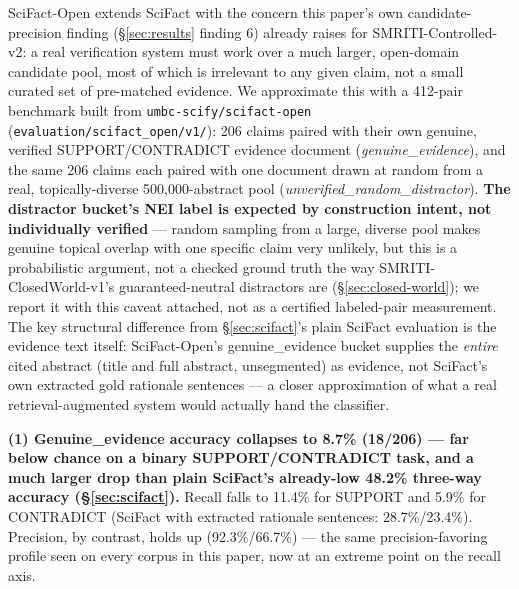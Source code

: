 

SciFact-Open \citep{wadden2022scifact} extends SciFact with the concern
this paper's own candidate-precision finding (\S\ref{sec:results} finding
6) already raises for SMRITI-Controlled-v2: a real verification system
must work over a much larger, open-domain candidate pool, most of which
is irrelevant to any given claim, not a small curated set of pre-matched
evidence. We approximate this with a 412-pair benchmark built from
\texttt{umbc-scify/scifact-open} (\texttt{evaluation/scifact\_open/v1/}):
206 claims paired with their own genuine, verified SUPPORT/CONTRADICT
evidence document (\emph{genuine\_evidence}), and the same 206 claims
each paired with one document drawn at random from a real,
topically-diverse 500{,}000-abstract pool (\emph{unverified\_random\_distractor}).
\textbf{The distractor bucket's NEI label is expected by construction
intent, not individually verified} --- random sampling from a large,
diverse pool makes genuine topical overlap with one specific claim very
unlikely, but this is a probabilistic argument, not a checked ground
truth the way SMRITI-ClosedWorld-v1's guaranteed-neutral distractors are
(\S\ref{sec:closed-world}); we report it with this caveat attached, not
as a certified labeled-pair measurement. The key structural difference
from \S\ref{sec:scifact}'s plain SciFact evaluation is the evidence text
itself: SciFact-Open's genuine\_evidence bucket supplies the
\emph{entire} cited abstract (title and full abstract, unsegmented) as
evidence, not SciFact's own extracted gold rationale sentences --- a
closer approximation of what a real retrieval-augmented system would
actually hand the classifier.

\textbf{(1) Genuine\_evidence accuracy collapses to 8.7\% (18/206) ---
far below chance on a binary SUPPORT/CONTRADICT task, and a much larger
drop than plain SciFact's already-low 48.2\% three-way accuracy
(\S\ref{sec:scifact}).} Recall falls to 11.4\% for SUPPORT and 5.9\% for
CONTRADICT (SciFact with extracted rationale sentences: 28.7\%/23.4\%).
Precision, by contrast, holds up (92.3\%/66.7\%) --- the same
precision-favoring profile seen on every corpus in this paper, now at an
extreme point on the recall axis.

